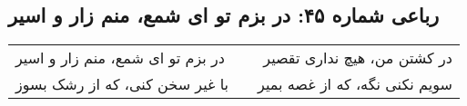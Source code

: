 \begin{center}
\section*{رباعی شماره ۴۵: در بزم تو ای شمع، منم زار و اسیر}
\label{sec:045}
\begin{longtable}{l p{0.5cm} r}
در بزم تو ای شمع، منم زار و اسیر
&&
در کشتن من، هیچ نداری تقصیر
\\
با غیر سخن کنی، که از رشک بسوز
&&
سویم نکنی نگه، که از غصه بمیر
\\
\end{longtable}
\end{center}

